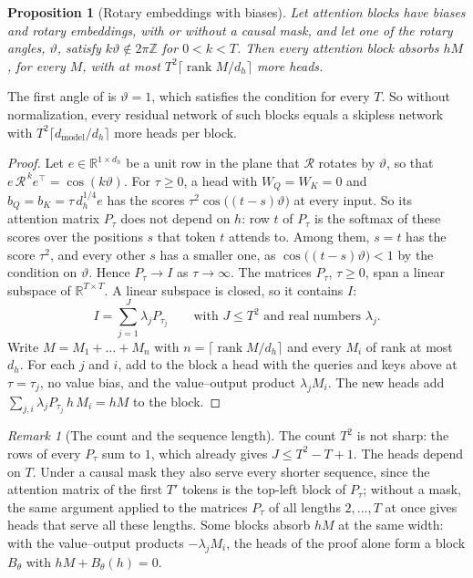 \documentclass[10pt]{article}
\newtheorem{proposition}[theorem]{Proposition}
\theoremstyle{definition}
\theoremstyle{remark}
\newtheorem{remark}[theorem]{Remark}
\newcommand{\R}{\mathbb{R}}
\newcommand{\dm}{d_{\mathrm{model}}}
\begin{document}
\begin{proposition}[Rotary embeddings with biases]\label{prop:rotarybias}
Let attention blocks have biases and rotary embeddings, with or without a causal mask, and let one of the rotary angles, $\vartheta$, satisfy $k\vartheta \notin 2\pi\mathbb{Z}$ for $0 < k < T$. Then every attention block absorbs $hM$, for every $M$, with at most $T^2\lceil\operatorname{rank}M/d_h\rceil$ more heads.
\end{proposition}

The first angle of \citet{su2021roformer} is $\vartheta = 1$, which satisfies the condition for every $T$. So without normalization, every residual network of such blocks equals a skipless network with $T^2\lceil\dm/d_h\rceil$ more heads per block.

\begin{proof}
Let $e \in \R^{1\times d_h}$ be a unit row in the plane that $\mathcal R$ rotates by $\vartheta$, so that $e\,\mathcal R^{\,k}e^\top = \cos(k\vartheta)$. For $\tau \ge 0$, a head with $W_Q = W_K = 0$ and $b_Q = b_K = \tau\,d_h^{1/4}e$ has the scores $\tau^2\cos\big((t - s)\vartheta\big)$ at every input. So its attention matrix $P_\tau$ does not depend on $h$: row $t$ of $P_\tau$ is the softmax of these scores over the positions $s$ that token $t$ attends to. Among them, $s = t$ has the score $\tau^2$, and every other $s$ has a smaller one, as $\cos\big((t - s)\vartheta\big) < 1$ by the condition on $\vartheta$. Hence $P_\tau \to I$ as $\tau \to \infty$. The matrices $P_\tau$, $\tau \ge 0$, span a linear subspace of $\R^{T\times T}$. A linear subspace is closed, so it contains $I$:
\[
I = \sum_{j=1}^{J}\lambda_jP_{\tau_j} \qquad\text{with } J \le T^2 \text{ and real numbers } \lambda_j .
\]
Write $M = M_1 + \dots + M_n$ with $n = \lceil\operatorname{rank}M/d_h\rceil$ and every $M_i$ of rank at most $d_h$. For each $j$ and $i$, add to the block a head with the queries and keys above at $\tau = \tau_j$, no value bias, and the value--output product $\lambda_jM_i$. The new heads add $\sum_{j,i}\lambda_jP_{\tau_j}\,h\,M_i = hM$ to the block.
\end{proof}

\begin{remark}[The count and the sequence length]\label{rem:rotarycount}
The count $T^2$ is not sharp: the rows of every $P_\tau$ sum to $1$, which already gives $J \le T^2 - T + 1$. The heads depend on $T$. Under a causal mask they also serve every shorter sequence, since the attention matrix of the first $T'$ tokens is the top-left block of $P_\tau$; without a mask, the same argument applied to the matrices $P_\tau$ of all lengths $2, \dots, T$ at once gives heads that serve all these lengths. Some blocks absorb $hM$ at the same width: with the value--output products $-\lambda_jM_i$, the heads of the proof alone form a block $B_\theta$ with $hM + B_\theta(h) = 0$.
\end{remark}
\end{document}
